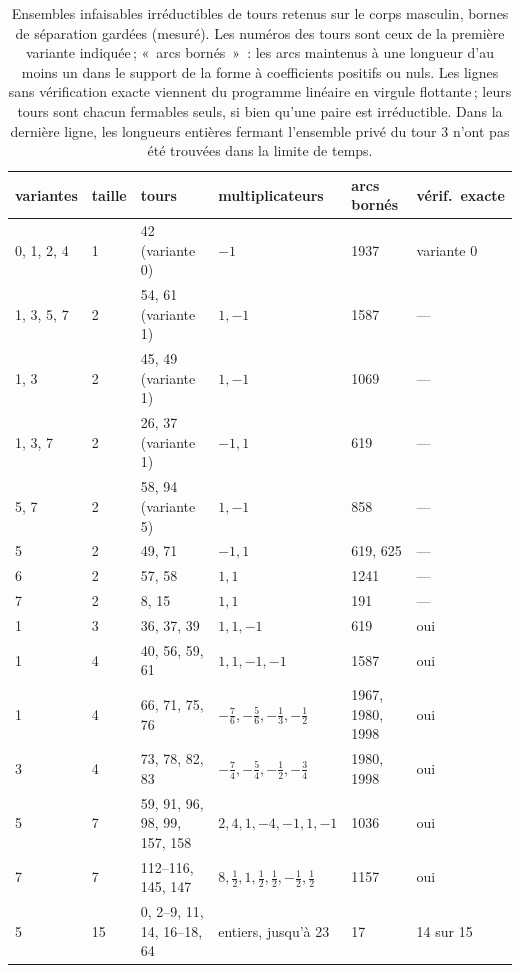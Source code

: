 \documentclass[11pt,a4paper]{article}
\begin{document}
\begin{table}[t]
\centering
\small
\setlength{\tabcolsep}{5pt}
\begin{tabular}{llllll}
\toprule
variantes & taille & tours & multiplicateurs & arcs bornés & vérif.\ exacte \\
\midrule
0, 1, 2, 4 & 1 & 42 (variante 0) & $-1$ & 1937 & variante 0 \\
1, 3, 5, 7 & 2 & 54, 61 (variante 1) & $1, -1$ & 1587 & --- \\
1, 3 & 2 & 45, 49 (variante 1) & $1, -1$ & 1069 & --- \\
1, 3, 7 & 2 & 26, 37 (variante 1) & $-1, 1$ & 619 & --- \\
5, 7 & 2 & 58, 94 (variante 5) & $1, -1$ & 858 & --- \\
5 & 2 & 49, 71 & $-1, 1$ & 619, 625 & --- \\
6 & 2 & 57, 58 & $1, 1$ & 1241 & --- \\
7 & 2 & 8, 15 & $1, 1$ & 191 & --- \\
1 & 3 & 36, 37, 39 & $1, 1, -1$ & 619 & oui \\
1 & 4 & 40, 56, 59, 61 & $1, 1, -1, -1$ & 1587 & oui \\
1 & 4 & 66, 71, 75, 76 & $-\tfrac76, -\tfrac56, -\tfrac13, -\tfrac12$ & 1967, 1980, 1998 & oui \\
3 & 4 & 73, 78, 82, 83 & $-\tfrac74, -\tfrac54, -\tfrac12, -\tfrac34$ & 1980, 1998 & oui \\
5 & 7 & 59, 91, 96, 98, 99, 157, 158 & $2, 4, 1, -4, -1, 1, -1$ & 1036 & oui \\
7 & 7 & 112--116, 145, 147 & $8, \tfrac12, 1, \tfrac12, \tfrac12, -\tfrac12, \tfrac12$ & 1157 & oui \\
5 & 15 & 0, 2--9, 11, 14, 16--18, 64 & entiers, jusqu'à 23 & 17 & 14 sur 15 \\
\bottomrule
\end{tabular}
\caption{Ensembles infaisables irréductibles de tours retenus sur le corps
masculin, bornes de séparation gardées (mesuré). Les numéros des tours sont
ceux de la première variante indiquée\,; «~arcs bornés~»~: les arcs maintenus
à une longueur d'au moins un dans le support de la forme à coefficients
positifs ou nuls. Les lignes sans vérification exacte viennent du programme
linéaire en virgule flottante\,; leurs tours sont chacun fermables seuls, si
bien qu'une paire est irréductible. Dans la dernière ligne, les longueurs
entières fermant l'ensemble privé du tour 3 n'ont pas été trouvées dans la
limite de temps.}
\label{tab:iis}
\end{table}
\end{document}
